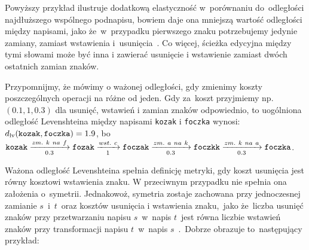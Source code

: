 \documentclass{praca1}
\begin{document}
Powyższy przykład ilustruje dodatkową elastyczność w~porównaniu do~odległości najdłuższego wspólnego podnapisu, bowiem daje ona mniejszą wartość odległości między napisami, jako że~w~przypadku pierwszego znaku potrzebujemy jedynie zamiany, zamiast wstawienia i~usunięcia~\cite{Loo2014:stringdist}. Co więcej, ścieżka edycyjna między tymi słowami może być inna i zawierać usunięcie i wstawienie zamiast dwóch ostatnich zamian znaków.


Przypomnijmy, że mówimy o ważonej odległości, gdy zmienimy koszty poszczególnych operacji na różne od jeden.
Gdy za~koszt przyjmiemy np. $(0.1, 1, 0.3)$ dla usunięć, wstawień i zamian znaków odpowiednio, to uogólniona odległość Levenshteina między napisami \verb|kozak| i \verb|foczka| wynosi: $d_{\mathrm{lv}}(\verb|kozak|, \verb|foczka|) = 1.9$, bo~$\verb|kozak|  \xrightarrow[0.3]{zm.\ k\ na\ f} \verb|fozak| \xrightarrow[1]{wst.\ c} \verb|foczak| \xrightarrow[0.3]{zm.\ a\ na\ k} \verb|foczkk| \xrightarrow[0.3]{zm.\ k\ na\ a} \verb|foczka|$.

Ważona odległość Levenshteina spełnia definicję metryki, gdy koszt usunięcia jest równy kosztowi wstawienia znaku. W przeciwnym przypadku nie spełnia ona założenia o~symetrii. Jednakowoż, symetria zostaje zachowana przy jednoczesnej zamianie $s$~i~$t$~oraz kosztów usunięcia i wstawienia znaku,~jako że~liczba usunięć znaków przy przetwarzaniu napisu $s$~w~napis $t$~jest równa liczbie wstawień znaków przy transformacji napisu $t$~w~napis $s$~\cite{Loo2014:stringdist}.~Dobrze obrazuje to~następujący przykład:
\end{document}
